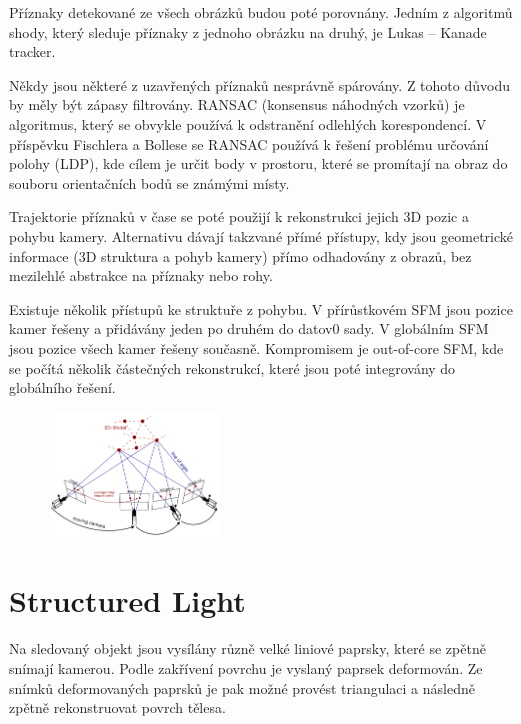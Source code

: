 Příznaky detekované ze všech obrázků budou poté porovnány. Jedním z algoritmů shody, který sleduje příznaky z jednoho obrázku na druhý, je Lukas – Kanade tracker.

Někdy jsou některé z uzavřených příznaků nesprávně spárovány. Z tohoto důvodu by měly být zápasy filtrovány. RANSAC (konsensus náhodných vzorků) je algoritmus, který se obvykle používá k odstranění odlehlých korespondencí. V příspěvku Fischlera a Bollese se RANSAC používá k řešení problému určování polohy (LDP), kde cílem je určit body v prostoru, které se promítají na obraz do souboru orientačních bodů se známými místy. 

Trajektorie příznaků v čase se poté použijí k rekonstrukci jejich 3D pozic a pohybu kamery. Alternativu dávají takzvané přímé přístupy, kdy jsou geometrické informace (3D struktura a pohyb kamery) přímo odhadovány z obrazů, bez mezilehlé abstrakce na příznaky nebo rohy.

Existuje několik přístupů ke struktuře z pohybu. V přírůstkovém SFM jsou pozice kamer řešeny a přidávány jeden po druhém do datov0 sady. V globálním SFM jsou pozice všech kamer řešeny současně. Kompromisem je out-of-core SFM, kde se počítá několik částečných rekonstrukcí, které jsou poté integrovány do globálního řešení. 

\begin{figure}[H]
 \centering
 \includegraphics[width=0.4\textwidth]{assets/10_SFM.png}
\end{figure}

\section{Structured Light}
Na sledovaný objekt jsou vysílány různě velké liniové paprsky, které se zpětně snímají kamerou. Podle zakřívení povrchu je vyslaný paprsek deformován. Ze snímků deformovaných paprsků je pak možné provést triangulaci a následně zpětně rekonstruovat povrch tělesa. 

